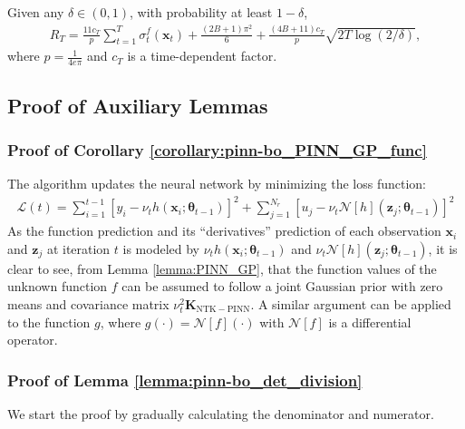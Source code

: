 \begin{auxlemma} 
\label{lemma:regret}
Given any $\delta \in (0, 1)$, with probability at least $1 - \delta$, 
\begin{align*}
    R_T = 
    \frac{11c_T}{p}\sum_{t=1}^T \sigma_t^f(\mathbf{x}_t) + \frac{(2B+1)\pi^2}{6} + \frac{(4B+11)c_T}{p} \sqrt{2T\log(2/\delta)} ,
\end{align*}
where $p=\frac{1}{4e\pi}$ and $c_T$ is a time-dependent factor. 
\end{auxlemma}

\subsection{Proof of Auxiliary Lemmas}
\subsubsection{Proof of Corollary  \ref{corollary:pinn-bo_PINN_GP_func}}
The algorithm updates the neural network by minimizing the loss function: \begin{align*}
    \mathcal{L}(t) = \sum^{t-1}_{i=1} [y_i - \nu_t h(\mathbf{x}_i; \boldsymbol{\theta}_{t-1})]^2 + \sum^{N_r}_{j=1}[u_j - \nu_t \mathcal{N}[h](\mathbf{z}_j; \boldsymbol{\theta}_{t-1})]^2
\end{align*} 
As the function prediction and its ``derivatives'' prediction of each observation $\mathbf{x}_i$ and $\mathbf{z}_j$ at iteration $t$ is modeled by $\nu_t h(\mathbf{x}_i; \boldsymbol{\theta}_{t-1})$ and $\nu_t \mathcal{N}[h](\mathbf{z}_j; \boldsymbol{\theta}_{t-1})$, it is clear to see, from Lemma \ref{lemma:PINN_GP}, that the function values of the unknown function $f$ can be assumed to follow a joint Gaussian prior with zero means and covariance matrix $\nu_t^2 \mathbf{K}_\mathrm{NTK-PINN}$. A similar argument can be applied to the function $g$, where $g(\cdot) = \mathcal{N}[f] (\cdot)$ with $\mathcal{N}[f]$ is a differential operator. 
\subsubsection{Proof of Lemma \ref{lemma:pinn-bo_det_division}}
We start the proof by gradually calculating the denominator and numerator.
